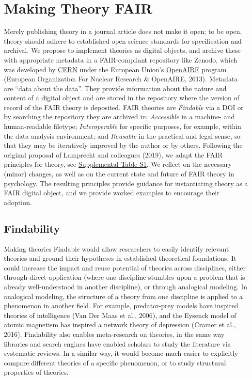 \documentclass[man]{apa7}
\begin{document}
\section{Making Theory FAIR}\label{making-theory-fair}

Merely publishing theory in a journal article does not make it open;
to be open, theory should adhere to established open science standards for specification and archival.
We propose to implement theories as digital objects,
and archive these with appropriate metadata in a FAIR-compliant repository like Zenodo,
which was developed by \href{https://home.cern/}{CERN} under the European Union's \href{https://www.openaire.eu/}{OpenAIRE} program (European Organization For Nuclear Research \& OpenAIRE, 2013).
Metadata are ``data about the data''.
They provide information about the nature and content of a digital object and are stored in the repository where the version of record of the FAIR theory is deposited.
FAIR theories are \emph{Findable} via a DOI or by searching the repository they are archived in;
\emph{Accessible} in a machine- and human-readable filetype;
\emph{Interoperable} for specific purposes, for example, within the data analysis environment;
and \emph{Reusable} in the practical and legal sense, so that they may be iteratively improved by the author or by others.
Following the original proposal of Lamprecht and colleagues (2019),
we adapt the FAIR principles for theory, see \href{https://github.com/cjvanlissa/fair_theory/blob/main/fair_principles.csv}{Supplemental Table S1}.
We reflect on the necessary (minor) changes,
as well as on the current state and future of FAIR theory in psychology.
The resulting principles provide guidance for instantiating theory as a FAIR digital object,
and we provide worked examples to encourage their adoption.

\subsection{Findability}\label{findability}

Making theories Findable would allow researchers to easily identify relevant theories
and ground their hypotheses in established theoretical foundations.
It could increase the impact and reuse potential of theories across disciplines,
either through direct application (where one discipline stumbles upon a problem that is already well-understood in another discipline),
or through analogical modeling.
In analogical modeling, the structure of a theory from one discipline is applied to a phenomenon in another field.
For example, predator-prey models have inspired theories of intelligence (Van Der Maas et al., 2006), and the Eysenck model of atomic magnetism has inspired a network theory of depression (Cramer et al., 2016).
Findability also enables meta-research on theories,
in the same way libraries and search engines have enabled scholars to study the literature via systematic reviews.
In a similar way, it would become much easier to explicitly compare different theories of a specific phenomenon,
or to study structural properties of theories.
\end{document}
